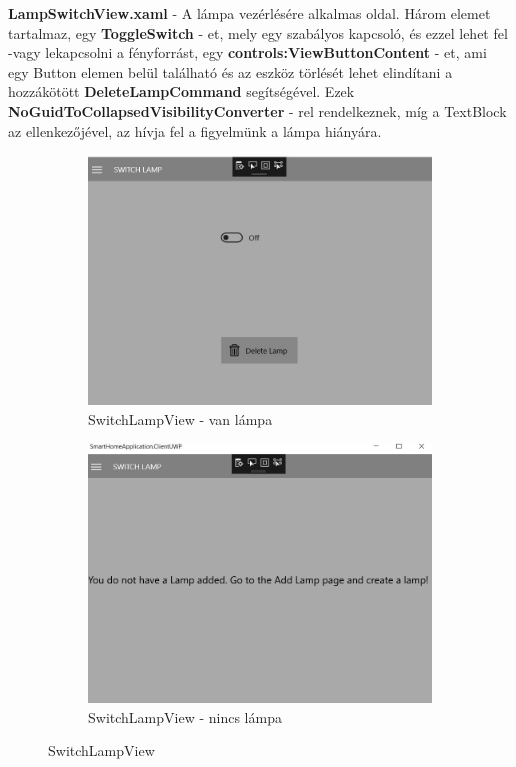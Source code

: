 \documentclass[a4paper,12pt]{report}
\begin{document}
    \textbf{LampSwitchView.xaml} - A lámpa vezérlésére alkalmas oldal. Három elemet tartalmaz, egy \textbf{ToggleSwitch} - et, mely
    egy szabályos kapcsoló, és ezzel lehet fel -vagy lekapcsolni a fényforrást, egy \textbf{controls:ViewButtonContent} - et, ami egy
    Button elemen belül található és az eszköz törlését lehet elindítani a hozzákötött \textbf{DeleteLampCommand} segítségével. Ezek
    \textbf{NoGuidToCollapsedVisibilityConverter} - rel rendelkeznek, míg a TextBlock az ellenkezőjével, az hívja fel a figyelmünk
    a lámpa hiányára.

\begin{figure}[H]
    \centering
    \begin{subfigure}[b]{0.4\linewidth}
        \includegraphics[width=\linewidth]{images/switchview.jpg}
        \caption{SwitchLampView - van lámpa}
    \end{subfigure}
    \begin{subfigure}[b]{0.4\linewidth}
        \includegraphics[width=\linewidth]{images/switchdonthavelamp.jpg}
        \caption{SwitchLampView - nincs lámpa}
    \end{subfigure}
    \caption{SwitchLampView}
    \label{fig:SwitchLamp}
\end{figure}
\end{document}

